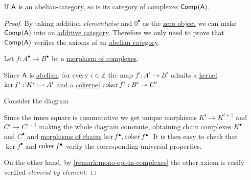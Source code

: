 \documentclass[../../../main]{subfiles}
\begin{document}
\begin{theorem} \label{thm:complex-category-is-abelian}
  If \(\mathsf{A}\) is an \hyperref[def:abelian-category]{abelian-category}, so is its \hyperref[def:complex-category]{category of complexes} \(\mathsf{Comp}^{}(\mathsf{A})\).
\end{theorem}
\begin{proof}
  By taking addition \textit{elementwise} and \(0^{\bullet}\) as the \hyperref[def:zero-object]{zero object} we can make \(\mathsf{Comp}^{}(\mathsf{A})\) into an \hyperref[def:additive-category]{additive category}.
  Therefore we only need to prove that \(\mathsf{Comp}^{}(\mathsf{A})\) verifies the axioms of an \hyperref[def:abelian-category]{abelian category}.

  Let \(f: A^{\bullet} \to B^{\bullet}\) be a \hyperref[def:complex-morphism]{morphism of complexes}.

  Since \(\mathsf{A}\) is \hyperref[def:abelian-category]{abelian}, for every \(i \in \mathbb{Z}\) the map \(f^{i}: A^{i} \to B^{i}\) admits a \hyperref[def:categorical-kernel]{kernel} \(\ker f^{i}: K^{i} \rightarrowtail A^{i}\) and a \hyperref[def:categorical-cokernel]{cokernel} \(\operatorname*{coker} f^{i}: B^{i} \twoheadrightarrow C^{i}\).

  Consider the diagram
  \begin{center}
  \end{center}
  Since the inner square is commutative we get unique morphisms \(K^{i} \to K^{i+1}\) and \(C^{i} \to C^{i+1}\) making the whole diagram commute, obtaining \hyperref[def:complexes]{chain complexes} \(K^{\bullet}\) and \(C^{\bullet}\) and \hyperref[def:complex-morphism]{morphisms of chains} \(\ker f^{\bullet}, \operatorname*{coker} f^{\bullet}\).
  It is then easy to check that \(\ker f^{\bullet}\) and \(\operatorname*{coker} f^{\bullet}\) verify the corresponding universal properties.

  On the other hand, by \autoref{remark:mono-epi-in-complexes} the other axiom is easily verified \textit{element by element}.
\end{proof}
\end{document}
